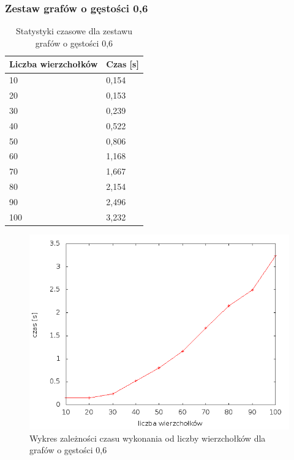 \documentclass[12pt, a4paper]{article}
\begin{document}
\subsubsection*{Zestaw grafów o gęstości 0,6}
\begin{table}[H]
\caption{Statystyki czasowe dla zestawu grafów o gęstości 0,6}
\begin{center}
    \begin{tabular}{|l|l|}
    \hline
    Liczba wierzchołków & Czas [s] \\ \hline
    10 & 0,154 \\ \hline
    20 & 0,153 \\ \hline
    30 & 0,239 \\ \hline
    40 & 0,522 \\ \hline
    50 & 0,806 \\ \hline
    60 & 1,168 \\ \hline
    70 & 1,667 \\ \hline
    80 & 2,154 \\ \hline
    90 & 2,496 \\ \hline
    100 & 3,232 \\ \hline
    \end{tabular}
\end{center}
\end{table}

\begin{figure}[h]
    \begin{center}
	\includegraphics[scale=0.5]{results/img/den/den_06.png}
	\caption{Wykres zależności czasu wykonania od liczby wierzchołków dla grafów o gęstości 0,6}
    \end{center}
\end{figure}
\end{document}

